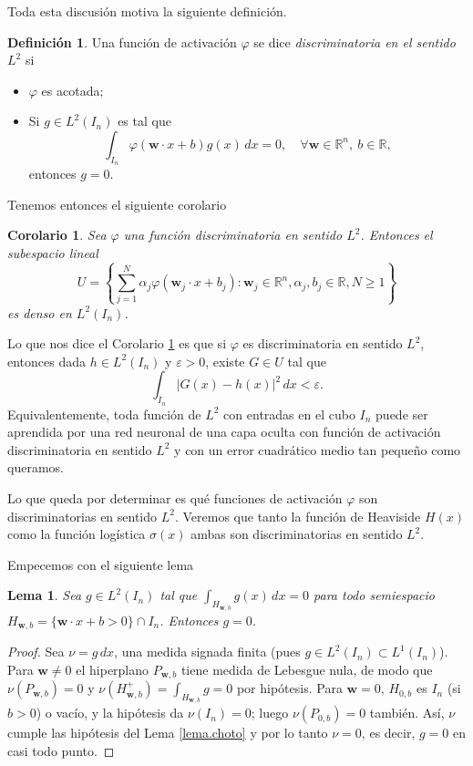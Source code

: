 \documentclass[12pt, a4paper]{amsbook}
\newcommand{\ve}{\varepsilon}
\newcommand{\R}{{\mathbb R}}
\newcommand{\ww}{{\mathbf w}}
\newtheorem{lema}[teo]{Lema}
\newtheorem{cor}[teo]{Corolario}
\theoremstyle{remark}
\theoremstyle{definition}
\newtheorem{defi}[teo]{Definici\'on}
\numberwithin{section}{chapter}
\numberwithin{subsection}{section}
\numberwithin{equation}{section}
\numberwithin{figure}{chapter}
\begin{document}
Toda esta discusión motiva la siguiente definición.
\begin{defi}\label{discri.L2}
Una función de activación $\varphi$ se dice {\em discriminatoria en el sentido $L^2$} si
\begin{itemize}
\item[(i)] $\varphi$ es acotada;
\item[(ii)] Si $g\in L^2(I_n)$ es tal que
$$
\int_{I_n} \varphi(\ww\cdot x + b) g(x)\, dx=0,\quad \forall \ww\in\R^n,\ b\in\R,
$$
entonces $g=0$.
\end{itemize}
\end{defi}

Tenemos entonces el siguiente corolario
\begin{cor}\label{cor.U.denso.L2}
Sea $\varphi$ una función discriminatoria en sentido $L^2$. Entonces el subespacio lineal
$$
U = \left\{ \sum_{j=1}^N \alpha_j \varphi(\ww_j \cdot x + b_j)\colon \ww_j\in\R^n, \alpha_j, b_j\in\R, N\ge 1\right\}
$$
es denso en $L^2(I_n)$.
\end{cor}

Lo que nos dice el Corolario \ref{cor.U.denso.L2} es que si $\varphi$ es discriminatoria en sentido $L^2$, entonces dada $h\in L^2(I_n)$ y $\ve>0$, existe $G\in U$ tal que
$$
\int_{I_n} |G(x)-h(x)|^2\, dx < \ve.
$$
Equivalentemente, toda función de $L^2$ con entradas en el cubo $I_n$ puede ser aprendida por una red neuronal de una capa oculta con función de activación discriminatoria en sentido $L^2$ y con un error cuadrático medio tan pequeño como queramos.

Lo que queda por determinar es qué funciones de activación $\varphi$ son discriminatorias en sentido $L^2$. Veremos que tanto la función de Heaviside $H(x)$ como la función logística $\sigma(x)$ ambas son discriminatorias en sentido $L^2$.

Empecemos con el siguiente lema
\begin{lema}\label{lema9.3.12}
Sea $g\in L^2(I_n)$ tal que $\int_{H_{\ww, b}} g(x)\, dx =0$ para todo semiespacio $H_{\ww, b} = \{ \ww\cdot x + b>0\}\cap I_n$. Entonces $g=0$.
\end{lema}

\begin{proof}
Sea $\nu=g\,dx$, una medida signada finita (pues $g\in L^2(I_n)\subset L^1(I_n)$). Para $\ww\neq0$ el hiperplano $P_{\ww,b}$ tiene medida de Lebesgue nula, de modo que $\nu(P_{\ww,b})=0$ y $\nu(H^+_{\ww,b})=\int_{H_{\ww,b}}g=0$ por hipótesis. Para $\ww=0$, $H_{0,b}$ es $I_n$ (si $b>0$) o vacío, y la hipótesis da $\nu(I_n)=0$; luego $\nu(P_{0,b})=0$ también. Así, $\nu$ cumple las hipótesis del Lema \ref{lema.choto} y por lo tanto $\nu=0$, es decir, $g=0$ en casi todo punto.
\end{proof}
\end{document}
